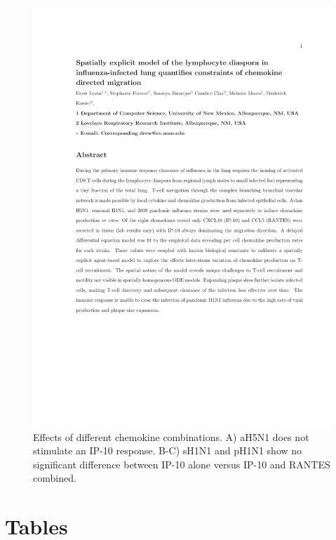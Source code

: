\documentclass[10pt]{article}
\begin{document}
\begin{figure}[ht!]
\begin{center}
	\includegraphics[width=\textwidth]{chemokine}
	\caption{Effects of different chemokine combinations.  A) aH5N1 does not stimulate an IP-10 response.  B-C) sH1N1 and pH1N1 show no significant difference between IP-10 alone versus IP-10 and RANTES combined.}
	\label{fig:chemokine}
\end{center}
\end{figure}

\section*{Tables}

\end{document}
